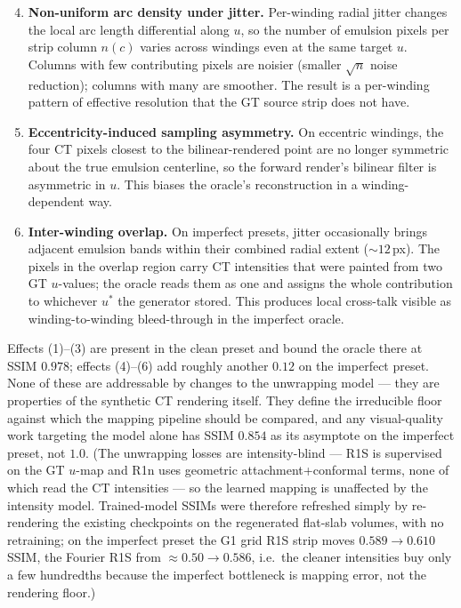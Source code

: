 \documentclass[11pt,a4paper]{article}
\begin{document}
\begin{enumerate}
    \setcounter{enumi}{3}
    \item \textbf{Non-uniform arc density under jitter.} Per-winding radial jitter changes the local arc length differential along $u$, so the number of emulsion pixels per strip column $n(c)$ varies across windings even at the same target $u$. Columns with few contributing pixels are noisier (smaller $\sqrt{n}$ noise reduction); columns with many are smoother. The result is a per-winding pattern of effective resolution that the GT source strip does not have.
    \item \textbf{Eccentricity-induced sampling asymmetry.} On eccentric windings, the four CT pixels closest to the bilinear-rendered point are no longer symmetric about the true emulsion centerline, so the forward render's bilinear filter is asymmetric in $u$. This biases the oracle's reconstruction in a winding-dependent way.
    \item \textbf{Inter-winding overlap.} On imperfect presets, jitter occasionally brings adjacent emulsion bands within their combined radial extent ($\sim 12$\,px). The pixels in the overlap region carry CT intensities that were painted from two GT $u$-values; the oracle reads them as one and assigns the whole contribution to whichever $u^*$ the generator stored. This produces local cross-talk visible as winding-to-winding bleed-through in the imperfect oracle.
\end{enumerate}

Effects (1)--(3) are present in the clean preset and bound the oracle there at SSIM $0.978$; effects (4)--(6) add roughly another $0.12$ on the imperfect preset. None of these are addressable by changes to the unwrapping model — they are properties of the synthetic CT rendering itself. They define the irreducible floor against which the mapping pipeline should be compared, and any visual-quality work targeting the model alone has SSIM $0.854$ as its asymptote on the imperfect preset, not $1.0$. (The unwrapping losses are intensity-blind --- R1S is supervised on the GT $u$-map and R1n uses geometric attachment+conformal terms, none of which read the CT intensities --- so the learned mapping is unaffected by the intensity model. Trained-model SSIMs were therefore refreshed simply by re-rendering the existing checkpoints on the regenerated flat-slab volumes, with no retraining; on the imperfect preset the G1 grid R1S strip moves $0.589 \to 0.610$ SSIM, the Fourier R1S from $\approx 0.50 \to 0.586$, i.e.\ the cleaner intensities buy only a few hundredths because the imperfect bottleneck is mapping error, not the rendering floor.)
\end{document}
